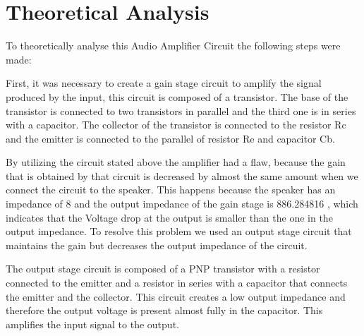 \section{Theoretical Analysis}
\label{sec:analysis}

To theoretically analyse this Audio Amplifier Circuit the following steps were made:

First, it was necessary to create a gain stage circuit to amplify the signal produced by the input, this circuit is composed of a transistor. The base of the transistor is connected to two transistors in parallel and the third one is in series with a capacitor. The collector of the transistor is connected to the resistor Rc and the emitter is connected to the parallel of resistor Re and capacitor Cb.

By utilizing the circuit stated above the amplifier had a flaw, because the gain that is obtained by that circuit is decreased by almost the same amount when we connect the circuit to the speaker. This happens because the speaker has an impedance of 8 \omega and the output impedance of the gain stage is 886.284816 \omega, which indicates that the Voltage drop at the output is smaller than the one in the output impedance. To resolve this problem we used an output stage circuit that maintains the gain but decreases the output impedance of the circuit. 

The output stage circuit is composed of a PNP transistor with a resistor connected to the emitter and a resistor in series with a capacitor that connects the emitter and the collector. This circuit creates a low output impedance and therefore the output voltage is present almost fully in the capacitor. This amplifies the input signal to the output.